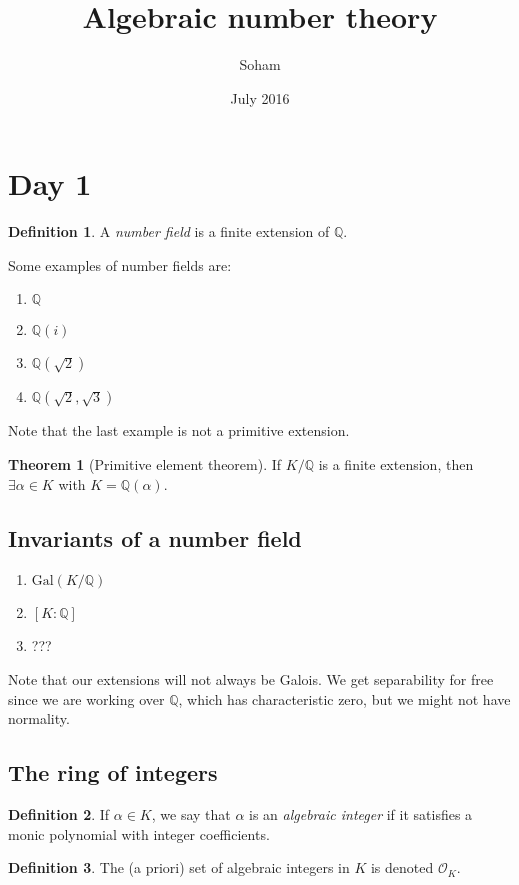 \documentclass{article}
\title{Algebraic number theory}
\author{Soham}
\date{July 2016}
\newcommand{\Q}{\mathbb Q}
\newcommand{\gal}[2]{\text{Gal}(#1/#2)}
\newcommand{\ok}{\mathcal O_K}
\theoremstyle{definition}
\newtheorem*{thm}{Theorem}
\newtheorem*{defn}{Definition}
\begin{document}
\maketitle
 
\section{Day 1}
\begin{defn}
 A \textit{number field} is a finite extension of $\Q$.
\end{defn}

Some examples of number fields are:
\begin{enumerate}
\item $\Q$
\item $\Q(i)$
\item $\Q(\sqrt 2)$
\item $\Q(\sqrt 2, \sqrt 3)$
\end{enumerate}

Note that the last example is not a primitive extension.
\begin{thm}[Primitive element theorem] 
  If $K/\Q$ is a finite extension, then $\exists \alpha\in K$ with $K=\Q(\alpha)$.
\end{thm}

\subsection{Invariants of a number field}
\begin{enumerate}
\item $\gal K\Q$
\item $[K:\Q]$
\item ???
\end{enumerate}

Note that our extensions will not always be Galois. We get separability for free
since we are working over $\Q$, which has characteristic zero, but we might not
have normality.

\subsection{The ring of integers}
\begin{defn}
 If $\alpha\in K$, we say that $\alpha$ is an \textit{algebraic integer} if it
 satisfies a monic polynomial with integer coefficients. 
\end{defn}
\begin{defn}
 The (a priori) set of algebraic integers in $K$ is denoted $\ok$.
\end{defn}
\end{document}

